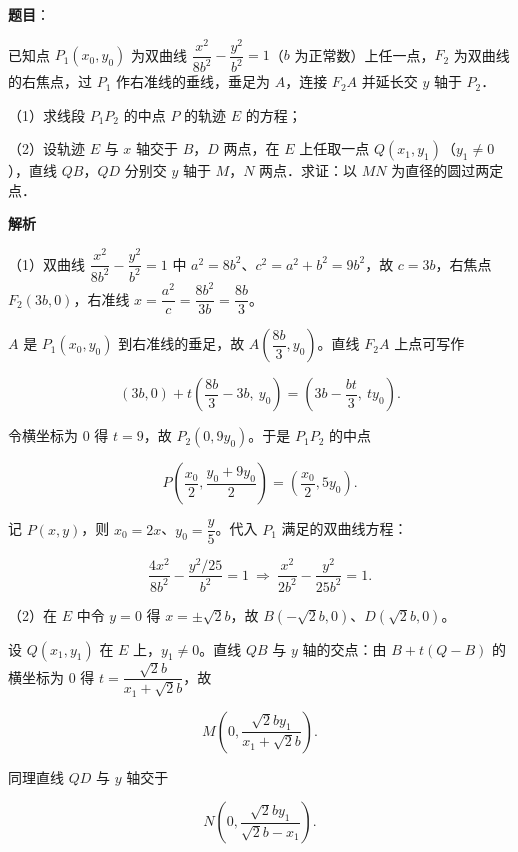 \begin{answer}

\textbf{题目}：

已知点 $P_1(x_0,y_0)$ 为双曲线 $\dfrac{x^2}{8b^2}-\dfrac{y^2}{b^2}=1$（$b$ 为正常数）上任一点，$F_2$ 为双曲线的右焦点，过 $P_1$ 作右准线的垂线，垂足为 $A$，连接 $F_2A$ 并延长交 $y$ 轴于 $P_2$．

（1）求线段 $P_1P_2$ 的中点 $P$ 的轨迹 $E$ 的方程；

（2）设轨迹 $E$ 与 $x$ 轴交于 $B$，$D$ 两点，在 $E$ 上任取一点 $Q(x_1,y_1)$（$y_1\neq0$），直线 $QB$，$QD$ 分别交 $y$ 轴于 $M$，$N$ 两点．求证：以 $MN$ 为直径的圆过两定点．
\nopagebreak[4]
\begin{center}\end{center}
\nopagebreak[4]
\textbf{解析}

（1）双曲线 $\dfrac{x^2}{8b^2}-\dfrac{y^2}{b^2}=1$ 中 $a^2=8b^2$、$c^2=a^2+b^2=9b^2$，故 $c=3b$，右焦点 $F_2(3b,0)$，右准线 $x=\dfrac{a^2}{c}=\dfrac{8b^2}{3b}=\dfrac{8b}{3}$。

$A$ 是 $P_1(x_0,y_0)$ 到右准线的垂足，故 $A\left(\dfrac{8b}{3},y_0\right)$。直线 $F_2A$ 上点可写作

\nopagebreak[4]
\[\left(3b,0\right)+t\left(\frac{8b}{3}-3b,\ y_0\right)=\left(3b-\frac{bt}{3},\ ty_0\right).\]

令横坐标为 $0$ 得 $t=9$，故 $P_2(0,9y_0)$。于是 $P_1P_2$ 的中点

\nopagebreak[4]
\[P\left(\frac{x_0}{2},\frac{y_0+9y_0}{2}\right)=\left(\frac{x_0}{2},5y_0\right).\]

记 $P(x,y)$，则 $x_0=2x$、$y_0=\dfrac y5$。代入 $P_1$ 满足的双曲线方程：

\nopagebreak[4]
\[\frac{4x^2}{8b^2}-\frac{y^2/25}{b^2}=1\ \Longrightarrow\ \frac{x^2}{2b^2}-\frac{y^2}{25b^2}=1.\]

（2）在 $E$ 中令 $y=0$ 得 $x=\pm\sqrt2b$，故 $B(-\sqrt2b,0)$、$D(\sqrt2b,0)$。

设 $Q(x_1,y_1)$ 在 $E$ 上，$y_1\neq0$。直线 $QB$ 与 $y$ 轴的交点：由 $B+t(Q-B)$ 的横坐标为 $0$ 得 $t=\dfrac{\sqrt2b}{x_1+\sqrt2b}$，故

\nopagebreak[4]
\[M\left(0,\frac{\sqrt2by_1}{x_1+\sqrt2b}\right).\]

同理直线 $QD$ 与 $y$ 轴交于

\nopagebreak[4]
\[N\left(0,\frac{\sqrt2by_1}{\sqrt2b-x_1}\right).\]


\end{answer}

